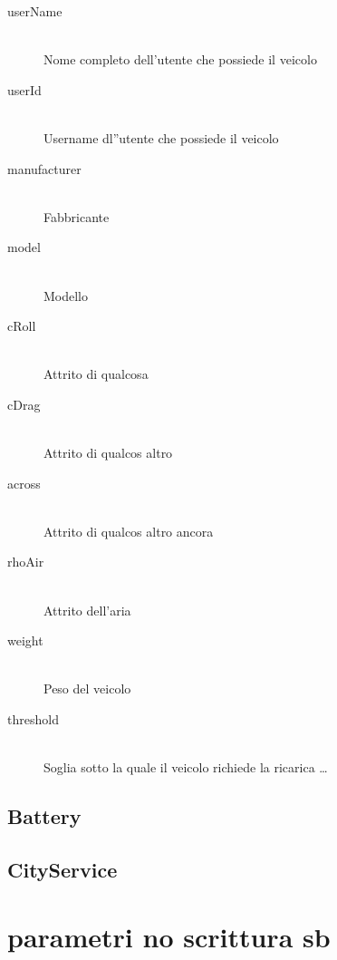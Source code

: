 \begin{description}
  \item[userName]  \hfill \\ 
      Nome completo dell'utente che possiede il veicolo
  \item[userId]  \hfill \\
      Username dl''utente che possiede il veicolo
  \item[manufacturer]  \hfill \\
      Fabbricante
  \item[model]  \hfill \\ 
      Modello
  \item[cRoll]  \hfill \\
      Attrito di qualcosa
  \item[cDrag]  \hfill \\
      Attrito di qualcos altro
  \item[across]  \hfill \\
      Attrito di qualcos altro ancora
  \item[rhoAir]  \hfill \\
      Attrito dell'aria
  \item[weight]  \hfill \\
      Peso del veicolo
  \item[threshold]  \hfill \\
      Soglia sotto la quale il veicolo richiede la ricarica \ldots
\end{description}

\subsection{Battery}

\subsection{CityService}


\section{parametri no scrittura sb}\label{sec:sim-par}

